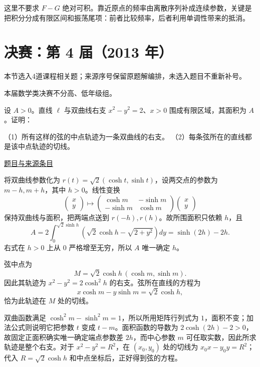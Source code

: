\documentclass[UTF8,12pt,a4paper,fontset=fandol]{ctexart}
\begin{document}
\begin{remark}[方法与条件]这里不要求 $F-G$ 绝对可积。靠近原点的频率由离散序列补成连续参数，关键是把积分分成有限区间和振荡尾项：前者比较频率，后者利用单调性带来的抵消。\end{remark}

\section{决赛：第 4 届（2013 年）}

本节选入4道课程相关题；来源序号保留原题解编排，未选入题目不重新补号。

\begin{remark}[来源说明]本届数学类决赛不分高、低年级组。\end{remark}

\begin{example}[来源序号1]\label{ex:fin04-all:1}\label{pr:fin04-all:1}

设 $A>0$。直线 $\ell$ 与双曲线右支 $x^2-y^2=2$、$x>0$ 围成有限区域，其面积为 $A$。证明：

（1）所有这样的弦的中点轨迹为一条双曲线的右支。
（2）每条弦所在的直线都是该中点轨迹的切线。

\par\href{https://github.com/lzxcr/cmc-mathematics/blob/64916fa1fdbc3e444a652eca204d5669058ee321/src/problems/finals/04/01.md}{题目与来源条目}

\end{example}

\begin{solve}\label{ans:fin04-all:1}

将双曲线参数化为 $r(t)=\sqrt2(\cosh t,\sinh t)$，设两交点的参数为 $m-h,m+h$，其中 $h>0$。线性变换
\[
\begin{pmatrix}x\\y\end{pmatrix}\longmapsto
\begin{pmatrix}\cosh m&-\sinh m\\-\sinh m&\cosh m\end{pmatrix}
\begin{pmatrix}x\\y\end{pmatrix}
\]
保持双曲线与面积，把两端点送到 $r(-h),r(h)$。故所围面积只依赖 $h$，且
\[
A=2\int_0^{\sqrt2\sinh h}\left(\sqrt2\cosh h-\sqrt{2+y^2}\right)dy
=\sinh(2h)-2h.
\]
右式在 $h>0$ 上从 $0$ 严格增至无穷，所以 $A$ 唯一确定 $h$。

弦中点为
\[
M=\sqrt2\cosh h\,(\cosh m,\sinh m).
\]
因此其轨迹为 $x^2-y^2=2\cosh^2h$ 的右支。弦所在直线的方程为
\[
x\cosh m-y\sinh m=\sqrt2\cosh h,
\]
恰为此轨迹在 $M$ 处的切线。

双曲函数满足 $\cosh^2m-\sinh^2m=1$，所以所用矩阵行列式为 $1$，面积不变；加法公式则说明它把参数 $t$ 变成 $t-m$。面积函数的导数为 $2\cosh(2h)-2>0$，故固定正面积确实唯一确定端点参数差 $2h$，而中心参数 $m$ 可任取实数，因此所求轨迹是整个右支。对于 $x^2-y^2=R^2$，在 $(x_0,y_0)$ 处的切线为 $x_0x-y_0y=R^2$；代入 $R=\sqrt2\cosh h$ 和中点坐标后，正好得到弦的方程。

\end{solve}
\end{document}
